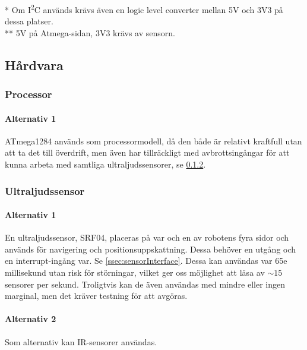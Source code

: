 \documentclass[a4paper,11pt]{article}
\begin{document}
\noindent \begin{small}
    * Om I\textsuperscript{2}C används krävs även en logic level converter mellan 5V och 3V3 på dessa platser.\\
    ** 5V på Atmega-sidan, 3V3 krävs av sensorn.
\end{small}
\subsection{Hårdvara}

\subsubsection{Processor} %

\paragraph{Alternativ 1} %
ATmega1284 används som processormodell, då den både är relativt kraftfull utan att ta det till överdrift, men även har tillräckligt med avbrottsingångar för att kunna arbeta med samtliga ultraljudssensorer, se \ref{sssec:sonicsensors}.

\subsubsection{Ultraljudssensor} \label{sssec:sonicsensors}
\paragraph{Alternativ 1}
En ultraljudssensor, SRF04, placeras på var och en av robotens fyra sidor och används för navigering och positionsuppskattning. Dessa behöver en utgång och en interrupt-ingång var. Se \ref{ssec:sensorInterface}. Dessa kan användas var 65e millisekund utan risk för störningar, vilket ger oss möjlighet att läsa av $\sim15$ sensorer per sekund. Troligtvis kan de även användas med mindre eller ingen marginal, men det kräver testning för att avgöras. %

\paragraph{Alternativ 2}
Som alternativ kan IR-sensorer användas. 
\end{document}
